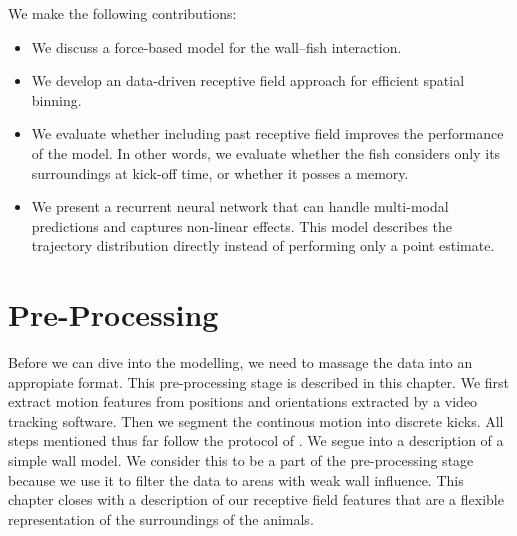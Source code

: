 \documentclass[nobib]{tufte-handout}
\begin{document}
We make the following contributions:
\begin{itemize}
\item We discuss a force-based model for the wall--fish interaction.
\item We develop an data-driven receptive field approach for efficient spatial binning.
\item We evaluate whether including past receptive field improves the performance of the model.
  In other words, we evaluate whether the fish considers only its surroundings at kick-off time, or whether it posses a memory.
\item We present a recurrent neural network that can handle multi-modal predictions and captures non-linear effects.
  This model describes the trajectory distribution directly instead of performing only a point estimate.
\end{itemize}

\section{Pre-Processing}
Before we can dive into the modelling, we need to massage the data into an appropiate format.
This pre-processing stage is described in this chapter.
We first extract motion features from positions and orientations extracted by a video tracking software.
Then we segment the continous motion into discrete kicks.
All steps mentioned thus far follow the protocol of \citeauthor{calovi}\autocite{calovi}.
We segue into a description of a simple wall model.
We consider this to be a part of the pre-processing stage because we use it to filter the data to areas with weak wall influence.
This chapter closes with a description of our receptive field features that are a flexible representation of the surroundings of the animals.
\end{document}
